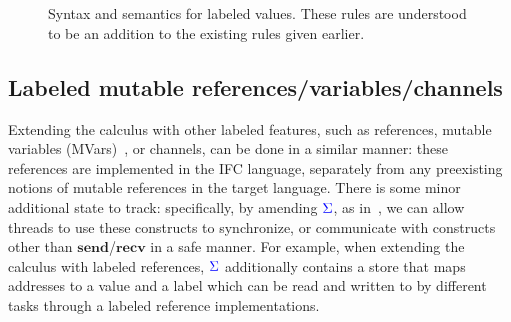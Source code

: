 \documentclass{llncs}
\newcommand{\Varid}[1]{\mathit{#1}}
\def\resethooks{\global\let\SaveRestoreHook\empty
  \global\let\ColumnHook\empty}
\let\hspost\empty
\begin{document}
\begin{figure}
        \begin{hscode}\SaveRestoreHook
\column{B}{@{}>{\hspre}l<{\hspost}@{}}\column{5}{@{}>{\hspre}l<{\hspost}@{}}\column{9}{@{}>{\hspre}l<{\hspost}@{}}\column{E}{@{}>{\hspre}l<{\hspost}@{}}\>[5]{}\ifc{\Varid{v}}{}\<[9]\>[9]{}\Coloneqq\cdots\mid {}\;\;\ifc{\Varid{e}}{}\<[E]\\
\>[5]{}\ifc{\Varid{e}}{}\<[9]\>[9]{}\Coloneqq\cdots\mid {}\;\ifc{\Varid{e}}\;\ifc{\Varid{e}}\mid {}\;\ifc{\Varid{e}}\mid {}\;\ifc{\Varid{e}}{}\<[E]\\
\>[5]{}\<[9]\>[9]{}\Coloneqq\cdots\mid {}\;\;\ifc{\Varid{e}}\mid {}\;\mid {}\;\<[E]\ColumnHook
\end{hscode}\resethooks
  \caption{Syntax and semantics for labeled values.  These rules are
    understood to be an addition to the existing rules given earlier.}
  \label{fig:labeled-vals}
  \end{figure}

\subsection{Labeled mutable references/variables/channels}
Extending the calculus with other labeled features, such as
references, mutable variables (MVars)~\cite{CH96}, or channels,
can be done in a similar manner: these references are implemented
in the IFC language, separately from any preexisting notions of
mutable references in the target language.
There is some minor additional state to track: specifically, by amending \ensuremath{\ifc{\Sigma}}, as in~\cite{lio,
stefan:addressing-covert}, we can allow threads to use these
constructs to synchronize, or communicate with constructs other than
\ensuremath{\mathbf{send}}/\ensuremath{\mathbf{recv}} in a safe manner.
For example, when extending the calculus with labeled references, \ensuremath{\ifc{\Sigma}}
additionally contains a store that maps addresses to a value
and a label
which can be read and written to by different tasks through a labeled
reference implementations.
\end{document}
